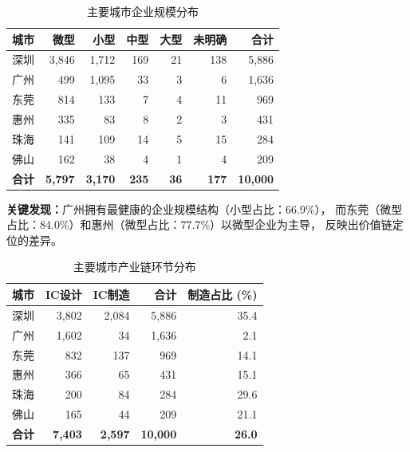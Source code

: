\documentclass[12pt,a4paper]{article}
\newcommand{\tableHeaderRow}{\rowcolor{tealPrimary}\color{white}}
\newcommand{\tableOddRow}{\rowcolor{mintBG}}
\newcommand{\tableEvenRow}{\rowcolor{white}}
\begin{document}
\begin{table}[H]
\centering
\small
\caption{主要城市企业规模分布}
\label{tab:city_scale}
\begin{tabular}{lrrrrrr}
\toprule
\tableHeaderRow
\textbf{城市} & \textbf{微型} & \textbf{小型} & \textbf{中型} & \textbf{大型} & \textbf{未明确} & \textbf{合计} \\
\midrule
\tableOddRow  深圳   & 3,846 & 1,712 & 169 & 21 & 138 & 5,886 \\
\tableEvenRow 广州   & 499   & 1,095 & 33  & 3  & 6   & 1,636 \\
\tableOddRow  东莞   & 814   & 133   & 7   & 4  & 11  & 969  \\
\tableEvenRow 惠州   & 335   & 83    & 8   & 2  & 3   & 431  \\
\tableOddRow  珠海   & 141   & 109   & 14  & 5  & 15  & 284  \\
\tableEvenRow 佛山   & 162   & 38    & 4   & 1  & 4   & 209  \\
\midrule
\tableOddRow  \textbf{合计} & \textbf{5,797} & \textbf{3,170} & \textbf{235} & \textbf{36} & \textbf{177} & \textbf{10,000} \\
\bottomrule
\end{tabular}
\end{table}

\textbf{关键发现：}广州拥有最健康的企业规模结构（小型占比：66.9\%），
而东莞（微型占比：84.0\%）和惠州（微型占比：77.7\%）以微型企业为主导，
反映出价值链定位的差异。


\begin{table}[H]
\centering
\small
\caption{主要城市产业链环节分布}
\label{tab:city_industry}
\begin{tabular}{lrrrr}
\toprule
\tableHeaderRow
\textbf{城市} & \textbf{IC设计} & \textbf{IC制造} & \textbf{合计} & \textbf{制造占比 (\%)} \\
\midrule
\tableOddRow  深圳   & 3,802 & 2,084 & 5,886 & 35.4 \\
\tableEvenRow 广州   & 1,602 & 34    & 1,636 & 2.1  \\
\tableOddRow  东莞   & 832   & 137   & 969   & 14.1 \\
\tableEvenRow 惠州   & 366   & 65    & 431   & 15.1 \\
\tableOddRow  珠海   & 200   & 84    & 284   & 29.6 \\
\tableEvenRow 佛山   & 165   & 44    & 209   & 21.1 \\
\midrule
\tableOddRow  \textbf{合计} & \textbf{7,403} & \textbf{2,597} & \textbf{10,000} & \textbf{26.0} \\
\bottomrule
\end{tabular}
\end{table}
\end{document}
